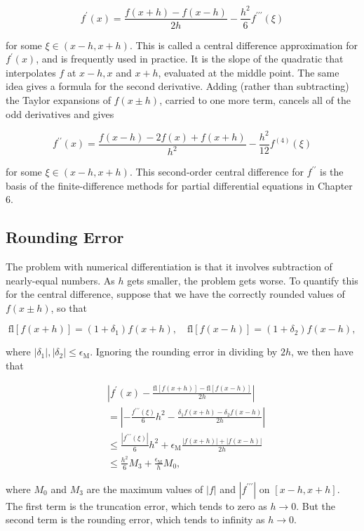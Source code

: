 \begin{definition}

  \[
f^{\prime}(x)=\frac{f(x+h)-f(x-h)}{2 h}-\frac{h^2}{6} f^{\prime \prime \prime}(\xi)
\]

for some \(\xi \in(x-h, x+h)\). This is called a central difference approximation for \(f^{\prime}(x)\), and is frequently used in practice. It is the slope of the quadratic that interpolates \(f\) at \(x-h, x\) and \(x+h\), evaluated at the middle point. The same idea gives a formula for the second derivative. Adding (rather than subtracting) the Taylor expansions of \(f(x \pm h)\), carried to one more term, cancels all of the odd derivatives and gives

\[
f^{\prime \prime}(x)=\frac{f(x-h)-2 f(x)+f(x+h)}{h^2}-\frac{h^2}{12} f^{(4)}(\xi)
\]

for some \(\xi \in(x-h, x+h)\). This second-order central difference for \(f^{\prime \prime}\) is the basis of the finite-difference methods for partial differential equations in Chapter 6.
  
\end{definition}

\subsection{Rounding Error}

\begin{remark}
  
The problem with numerical differentiation is that it involves subtraction of nearly-equal numbers. As \(h\) gets smaller, the problem gets worse. To quantify this for the central difference, suppose that we have the correctly rounded values of \(f(x \pm h)\), so that

\[
\mathrm{fl}[f(x+h)]=\left(1+\delta_1\right) f(x+h), \quad \mathrm{fl}[f(x-h)]=\left(1+\delta_2\right) f(x-h),
\]

where \(\left|\delta_1\right|,\left|\delta_2\right| \leq \epsilon_{\mathrm{M}}\). Ignoring the rounding error in dividing by \(2 h\), we then have that

\[
\begin{aligned}
& \left|f^{\prime}(x)-\frac{\mathrm{fl}[f(x+h)]-\mathrm{fl}[f(x-h)]}{2 h}\right| \\
& =\left|-\frac{f^{\prime \prime \prime}(\xi)}{6} h^2-\frac{\delta_1 f(x+h)-\delta_2 f(x-h)}{2 h}\right| \\
& \leq \frac{\left|f^{\prime \prime \prime}(\xi)\right|}{6} h^2+\epsilon_{\mathrm{M}} \frac{|f(x+h)|+|f(x-h)|}{2 h} \\
& \leq \frac{h^2}{6} M_3+\frac{\epsilon_{\mathrm{M}}}{h} M_0,
\end{aligned}
\]

where \(M_0\) and \(M_3\) are the maximum values of \(|f|\) and \(\left|f^{\prime \prime \prime}\right|\) on \([x-h, x+h]\). The first term is the truncation error, which tends to zero as \(h \rightarrow 0\). But the second term is the rounding error, which tends to infinity as \(h \rightarrow 0\).


\end{remark}

